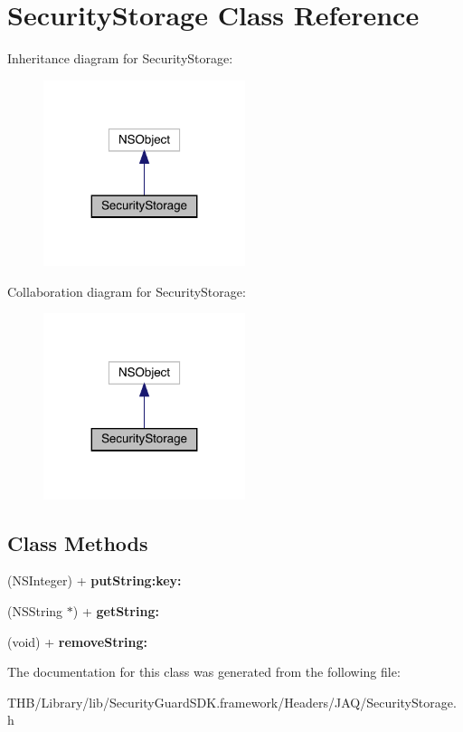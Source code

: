 \hypertarget{interface_security_storage}{}\section{Security\+Storage Class Reference}
\label{interface_security_storage}


Inheritance diagram for Security\+Storage\+:\nopagebreak
\begin{figure}[H]
\begin{center}
\leavevmode
\includegraphics[width=167pt]{interface_security_storage__inherit__graph}
\end{center}
\end{figure}


Collaboration diagram for Security\+Storage\+:\nopagebreak
\begin{figure}[H]
\begin{center}
\leavevmode
\includegraphics[width=167pt]{interface_security_storage__coll__graph}
\end{center}
\end{figure}
\subsection*{Class Methods}
\begin{DoxyCompactItemize}
\item 
\mbox{\label{interface_security_storage_ac2b643a2c1ffe60d2f7bb7d198f68f58}} 
(N\+S\+Integer) + {\bfseries put\+String\+:key\+:}
\item 
\mbox{\label{interface_security_storage_a01790cd11184a8467c2a4ef76823655f}} 
(N\+S\+String $\ast$) + {\bfseries get\+String\+:}
\item 
\mbox{\label{interface_security_storage_af6931d2d18ecc12a751da13df055d4e6}} 
(void) + {\bfseries remove\+String\+:}
\end{DoxyCompactItemize}


The documentation for this class was generated from the following file\+:\begin{DoxyCompactItemize}
\item 
T\+H\+B/\+Library/lib/\+Security\+Guard\+S\+D\+K.\+framework/\+Headers/\+J\+A\+Q/Security\+Storage.\+h\end{DoxyCompactItemize}
